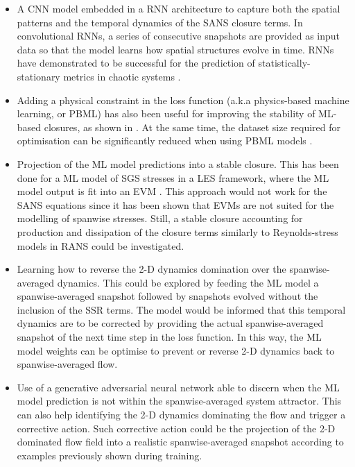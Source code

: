 \documentclass[../main.tex]{subfiles}
\begin{document}
\begin{itemize}
	\item A CNN model embedded in a RNN architecture to capture both the spatial patterns and the temporal dynamics of the SANS closure terms.
	In convolutional RNNs, a series of consecutive snapshots are provided as input data so that the model learns how spatial structures evolve in time.
	RNNs have demonstrated to be successful for the prediction of statistically-stationary metrics in chaotic systems \citep{Vlachas2018,Kim2020a}.

	\item Adding a physical constraint in the loss function (a.k.a physics-based machine learning, or PBML) has also been useful for improving the stability of ML-based closures, as shown in \cite{Lee2019}.
	At the same time, the dataset size required for optimisation can be significantly reduced when using PBML models \citep{Weymouth2019}.

	\item Projection of the ML model predictions into a stable closure. This has been done for a ML model of SGS stresses in a LES framework, where the ML model output is fit into an EVM \citep{Beck2019}.
	This approach would not work for the SANS equations since it has been shown that EVMs are not suited for the modelling of spanwise stresses.
	Still, a stable closure accounting for production and dissipation of the closure terms similarly to Reynolds-stress models in RANS could be investigated.

	\item Learning how to reverse the 2-D dynamics domination over the spanwise-averaged dynamics. 
	This could be explored by feeding the ML model a spanwise-averaged snapshot followed by snapshots evolved without the inclusion of the SSR terms.
	The model would be informed that this temporal dynamics are to be corrected by providing the actual spanwise-averaged snapshot of the next time step in the loss function.
	In this way, the ML model weights can be optimise to prevent or reverse 2-D dynamics back to spanwise-averaged flow.

	\item Use of a generative adversarial neural network \citep{Goodfellow2014} able to discern when the ML model prediction is not within the spanwise-averaged system attractor.
	This can also help identifying the 2-D dynamics dominating the flow and trigger a corrective action.
	Such corrective action could be the projection of the 2-D dominated flow field into a realistic spanwise-averaged snapshot according to examples previously shown during training.
\end{itemize}
\end{document}
